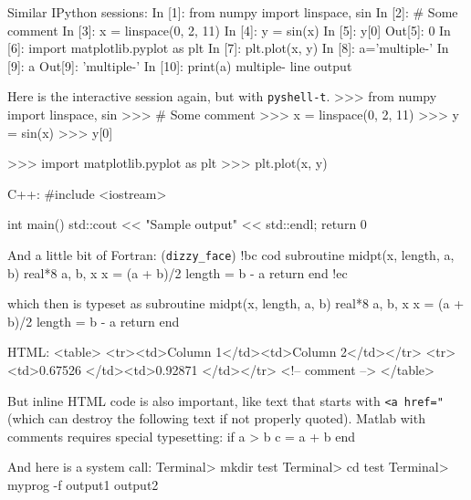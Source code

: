 \documentclass[%
oneside,                 %
final,                   %
10pt]{article}
\theoremstyle{definition}
\begin{document}
\epyshell

Similar IPython sessions:
\bipy
In [1]: from numpy import linspace, sin
In [2]: # Some comment
In [3]: x = linspace(0, 2, 11)
In [4]: y = sin(x)
In [5]: y[0]
Out[5]: 0
In [6]: import matplotlib.pyplot as plt
In [7]: plt.plot(x, y)
In [8]: a='multiple-\nline\noutput'
In [9]: a
Out[9]: 'multiple-\nline\noutput'
In [10]: print(a)
multiple-
line
output

\eipy

Here is the interactive session again, but with \texttt{pyshell-t}.
\bpyshell
>>> from numpy import linspace, sin
>>> # Some comment
>>> x = linspace(0, 2, 11)
>>> y = sin(x)
>>> y[0]

>>> import matplotlib.pyplot as plt
>>> plt.plot(x, y)

\epyshell

C++:
\bcpppro
#include <iostream>

int main()
{
   std::cout << "Sample output" << std::endl;
   return 0
}

\ecpppro

And a little bit of Fortran: (\Verb!dizzy_face!)
\bdo
!bc cod
      subroutine midpt(x, length, a, b)
      real*8 a, b, x
      x = (a + b)/2
      length = b - a
      return
      end
!ec

\edo

which then is typeset as
\bcod
      subroutine midpt(x, length, a, b)
      real*8 a, b, x
      x = (a + b)/2
      length = b - a
      return
      end

\ecod

HTML:
\bhtmlcod
<table>
<tr><td>Column 1</td><td>Column 2</td></tr>
<tr><td>0.67526 </td><td>0.92871 </td></tr>
<!-- comment -->
</table>

\ehtmlcod

But inline HTML code is also important, like text that starts with
\texttt{<a href="} (which can destroy the following text if not properly
quoted).
Matlab with comments requires special typesetting:
\bmcod
if a > b
  c = a + b
end

\emcod

And here is a system call:
\bsys
Terminal> mkdir test
Terminal> cd test
Terminal> myprog -f
output1
output2

\esys
\end{document}

